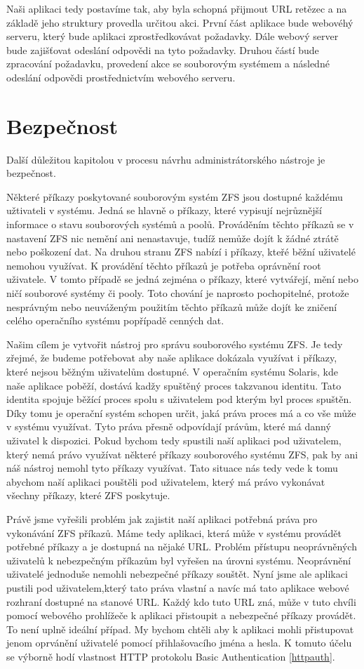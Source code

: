 Naši aplikaci tedy postavíme tak, aby byla schopná přijmout URL retězec a na základě jeho struktury provedla určitou akci. První část aplikace bude webovéhý serveru, který bude aplikaci zprostředkovávat požadavky. Dále webový server bude zajišťovat odeslání odpovědi na tyto požadavky. Druhou částí bude zpracování požadavku, provedení akce se souborovým systémem a následné odeslání odpovědi prostřednictvím webového serveru.
\section{Bezpečnost}
Další důležitou kapitolou v procesu návrhu administrátorského nástroje je bezpečnost.

Některé příkazy poskytované souborovým systém ZFS jsou dostupné každému užtivateli v systému. Jedná se hlavně o příkazy, které vypisují nejrůznější informace o stavu souborových systémů a poolů. Prováděním těchto příkazů se v nastavení ZFS nic nemění ani nenastavuje, tudíž nemůže dojít k žádné ztrátě nebo poškození dat. Na druhou stranu ZFS nabízí i příkazy, kteřé běžní uživatelé nemohou využívat. K provádění těchto příkazů je potřeba oprávnění root uživatele. V tomto případě se jedná zejména o příkazy, které vytvářejí, mění nebo ničí souborové systémy či pooly. Toto chování je naprosto pochopitelné, protože nesprávným nebo neuváženým použitím těchto příkazů může dojít ke zničení celého operačního systému popřípadě cenných dat.

Našim cílem je vytvořit nástroj pro správu souborového systému ZFS. Je tedy zřejmé, že budeme potřebovat aby naše aplikace dokázala využívat i příkazy, které nejsou běžným uživatelům dostupné. V operačním systému Solaris, kde naše aplikace poběží, dostává kadžy spuštěný proces takzvanou identitu. Tato identita spojuje běžící proces spolu s uživatelem pod kterým byl proces spuštěn. Díky tomu je operační systém schopen určit, jaká práva proces má a co vše může v systému využívat. Tyto práva přesně odpovídají právům, které má danný uživatel k dispozici. Pokud bychom tedy spustili naší aplikaci pod uživatelem, který nemá právo využívat některé příkazy souborového systému ZFS, pak by ani náš nástroj nemohl tyto příkazy využívat. Tato situace nás tedy vede k tomu abychom naší aplikaci pouštěli pod uživatelem, který má právo vykonávat všechny příkazy, které ZFS poskytuje.

Právě jsme vyřešili problém jak zajistit naší aplikaci potřebná práva pro vykonávání ZFS příkazů. Máme tedy aplikaci, která může v systému provádět potřebné příkazy a je dostupná na nějaké URL. Problém přístupu neoprávněných uživatelů k nebezpečným příkazům byl vyřešen na úrovni systému. Neoprávnění uživatelé jednoduše nemohli nebezpečné příkazy souštět. Nyní jsme ale aplikaci pustili pod uživatelem,který tato práva vlastní a navíc má tato aplikace webové rozhraní dostupné na stanové URL. Každý kdo tuto URL zná, může v tuto chvíli pomocí webového prohlížeče k aplikaci přistoupit a nebezpečné příkazy provádět. To není uplně ideální případ. My bychom chtěli aby k aplikaci mohli přistupovat jenom oprvánění uživatelé pomocí přihlašovacího jména a hesla. K tomuto účelu se výborně hodí vlastnost HTTP protokolu Basic Authentication \ref{httpauth}.

